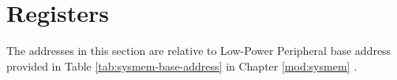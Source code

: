 \documentclass[main\_\_EN.tex]{subfiles}
\begin{document}



\section{Registers}

The addresses in this section are relative to Low-Power Peripheral base address provided in Table \ref{tab:sysmem-base-address} in Chapter \ref{mod:sysmem} \textit{}.



\end{document}
